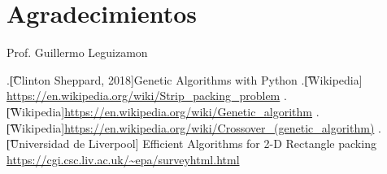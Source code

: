 \documentclass[10pt]{article}
\begin{document}
\section*{Agradecimientos}
Prof. Guillermo Leguizamon


\begin{thebibliography}{99} %
.\t[Clinton Sheppard, 2018]{}Genetic Algorithms with Python
.\t[Wikipedia]{} \url{https://en.wikipedia.org/wiki/Strip_packing_problem}
.\t[Wikipedia]{}\url{https://en.wikipedia.org/wiki/Genetic_algorithm}
.\t[Wikipedia]{}\url{https://en.wikipedia.org/wiki/Crossover_(genetic_algorithm)}
.\t[Universidad de Liverpool]{} Efficient Algorithms for 2-D Rectangle packing \url{https://cgi.csc.liv.ac.uk/~epa/surveyhtml.html}

\end{thebibliography} 
 
\end{document}
